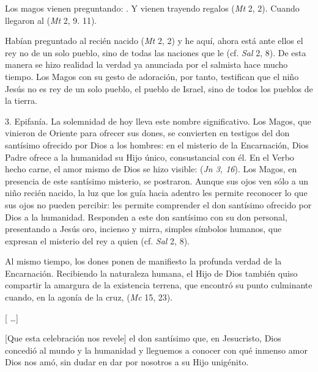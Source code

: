 \begin{body}
	Los magos vienen preguntando: . Y vienen trayendo regalos (\emph{Mt} 2, 2). Cuando llegaron al  (\emph{Mt} 2, 9. 11).

	Habían preguntado al recién nacido  (\emph{Mt} 2, 2) y he aquí, ahora está ante ellos el rey no de un solo pueblo, sino de todas las naciones que le  (cf. \emph{Sal} 2, 8). De esta manera se hizo realidad la verdad ya anunciada por el salmista hace mucho tiempo. Los Magos con su gesto de adoración, por tanto, testifican que el niño Jesús no es rey de un solo pueblo, el pueblo de Israel, sino de todos los pueblos de la tierra.

	3. Epifanía. La solemnidad de hoy lleva este nombre significativo. Los Magos, que vinieron de Oriente para ofrecer sus dones, se convierten en testigos del don santísimo ofrecido por Dios a los hombres: en el misterio de la Encarnación, Dios Padre ofrece a la humanidad su Hijo único, consustancial con él. En el Verbo hecho carne, el amor mismo de Dios se hizo visible:  (\emph{Jn 3, 16}). Los Magos, en presencia de este santísimo misterio, se postraron. Aunque sus ojos ven sólo a un niño recién nacido, la luz que los guía hacia adentro les permite reconocer lo que sus ojos no pueden percibir: les permite comprender el don santísimo ofrecido por Dios a la humanidad. Responden a este don santísimo con su don personal, presentando a Jesús oro, incienso y mirra, simples símbolos humanos, que expresan el misterio del rey a quien  (cf. \emph{Sal} 2, 8).

	Al mismo tiempo, los dones ponen de manifiesto la profunda verdad de la Encarnación. Recibiendo la naturaleza humana, el Hijo de Dios también quiso compartir la amargura de la existencia terrena, que encontró su punto culminante cuando, en la agonía de la cruz,  (\emph{Mc} 15, 23).

	{[} \ldots{}{]}

	{[}Que esta celebración nos revele{]} el don santísimo que, en Jesucristo, Dios concedió al mundo y la humanidad y lleguemos a conocer con qué inmenso amor Dios nos amó, sin dudar en dar por nosotros a su Hijo unigénito.


\end{body}
